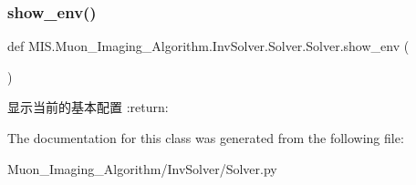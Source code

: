 \subsubsection{\texorpdfstring{show\+\_\+env()}{show\_env()}}
{\footnotesize\ttfamily def M\+I\+S.\+Muon\+\_\+\+Imaging\+\_\+\+Algorithm.\+Inv\+Solver.\+Solver.\+Solver.\+show\+\_\+env (\begin{DoxyParamCaption}{ }\end{DoxyParamCaption})\hspace{0.3cm}{\ttfamily [static]}}

\begin{DoxyVerb}显示当前的基本配置
:return:
\end{DoxyVerb}
 

The documentation for this class was generated from the following file\+:\begin{DoxyCompactItemize}
\item 
Muon\+\_\+\+Imaging\+\_\+\+Algorithm/\+Inv\+Solver/Solver.\+py\end{DoxyCompactItemize}
